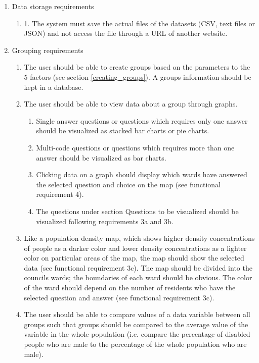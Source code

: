 \begin{enumerate}
  \item Data storage requirements
    \begin{enumerate}
      \item 1.	The system must save the actual files of the datasets (CSV, text files or JSON) and not access the file through a URL of another website.
    \end{enumerate}
  \item Grouping requirements
    \begin{enumerate}
		\item The user should be able to create groups based on the parameters to the 5 factors (see section \ref{creating_groups}). A group\textquotesingle s information should be kept in a database.
		\item The user should be able to view data about a group through graphs.
			\begin{enumerate}
				\item Single answer questions or questions which requires only one answer should be visualized as stacked bar charts or pie charts.
				\item Multi-code questions or questions which requires more than one answer should be visualized as bar charts.
				\item Clicking data on a graph should display which wards have answered the selected question and choice on the map (see functional requirement 4).
				\item The questions under section Questions to be visualized should be visualized following requirements 3a and 3b.
			\end{enumerate}
		\item Like a population density map, which shows higher density concentrations of people as a darker color and lower density concentrations as a lighter color on particular areas of the map, the map should show the selected data (see functional requirement 3c). The map should be divided into the council\textquotesingle s wards; the boundaries of each ward should be obvious. The color of the ward should depend on the number of residents who have the selected question and answer (see functional requirement 3c).
		\item The user should be able to compare values of a data variable between all groups such that groups should be compared to the average value of the variable in the whole population (i.e. compare the percentage of disabled people who are male to the percentage of the whole population who are male).

\end{enumerate}
\end{enumerate}
